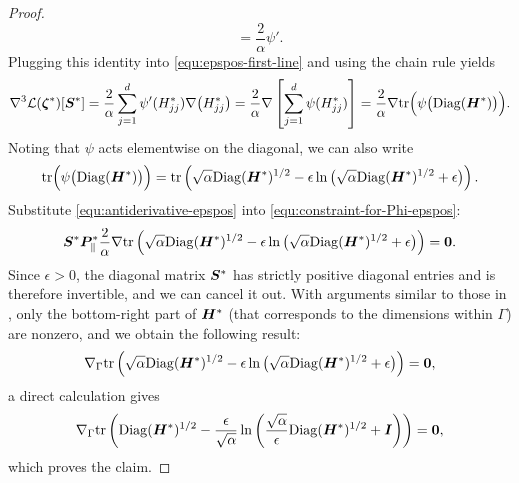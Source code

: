 \begin{proof}
\[        = \frac{2}{\alpha}\psi'.
    \]
    Plugging this identity into \eqref{equ:epspos-first-line} and using the chain rule yields
    \begin{align}
        \nabla^3 \mathcal{L}({\bm{\zeta}}^*)[{\bm{S}}^*]
        = \frac{2}{\alpha}\sum_{j=1}^d \psi'(H^*_{jj})\nabla\big(H^*_{jj}\big)
        = \frac{2}{\alpha}\nabla\left[\sum_{j=1}^d \psi(H^*_{jj})\right]
        = \frac{2}{\alpha}\nabla \text{tr}\Big(\psi\big(\mathrm{Diag}({\bm{H}}^*)\big)\Big).
        \label{equ:antiderivative-epspos}
    \end{align}
    Noting that $\psi$ acts elementwise on the diagonal, we can also write
    \[
        \text{tr}\Big(\psi\big(\mathrm{Diag}({\bm{H}}^*)\big)\Big)
        = \text{tr}\left( \sqrt{\alpha}\mathrm{Diag}({\bm{H}}^*)^{1/2}
        - \epsilon\ln\big(\sqrt{\alpha}\mathrm{Diag}({\bm{H}}^*)^{1/2}+\epsilon\big) \right).
    \]
    Substitute \eqref{equ:antiderivative-epspos} into \eqref{equ:constraint-for-Phi-epspos}:
    \[
        {\bm{S}}^* {\bm{P}}^*_{\parallel}\frac{2}{\alpha}
        \nabla \text{tr}\left( \sqrt{\alpha}\mathrm{Diag}({\bm{H}}^*)^{1/2}
        - \epsilon\ln\big(\sqrt{\alpha}\mathrm{Diag}({\bm{H}}^*)^{1/2}+\epsilon\big) \right)
        ={\bm{0}}.
    \]
    Since $\epsilon>0$, the diagonal matrix ${\bm{S}}^*$ has strictly positive diagonal entries and is therefore invertible, and we can cancel it out. With arguments similar to those in , only the bottom-right part of ${\bm{H}}^*$ (that corresponds to the dimensions within $\Gamma$) are nonzero, and we obtain the following result:
    \[
        \nabla_{\Gamma} \text{tr}\left( \sqrt{\alpha}\mathrm{Diag}({\bm{H}}^*)^{1/2}
        - \epsilon\ln\big(\sqrt{\alpha}\mathrm{Diag}({\bm{H}}^*)^{1/2}+\epsilon\big) \right)
        = {\bm{0}},
    \]
    a direct calculation gives 
\begin{align*}
    \nabla_{\Gamma} \text{tr}\left( \mathrm{Diag}({\bm{H}}^*)^{1/2}
        - \frac{\epsilon}{\sqrt{\alpha}}\ln\left( \frac{\sqrt{\alpha}}{\epsilon}\mathrm{Diag}({\bm{H}}^*)^{1/2}+{\bm{I}}\right) \right)
        ={\bm{0}},
\end{align*}
    which proves the claim.
\end{proof}

